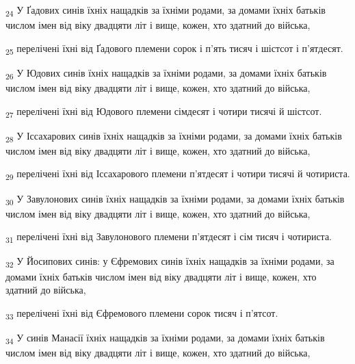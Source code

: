 \begin{tcolorbox}
\textsubscript{24} У Ґадових синів їхніх нащадків за їхніми родами, за домами їхніх батьків числом імен від віку двадцяти літ і вище, кожен, хто здатний до війська,
\end{tcolorbox}
\begin{tcolorbox}
\textsubscript{25} перелічені їхні від Ґадового племени сорок і п'ять тисяч і шістсот і п'ятдесят.
\end{tcolorbox}
\begin{tcolorbox}
\textsubscript{26} У Юдових синів їхніх нащадків за їхніми родами, за домами їхніх батьків числом імен від віку двадцяти літ і вище, кожен, хто здатний до війська,
\end{tcolorbox}
\begin{tcolorbox}
\textsubscript{27} перелічені їхні від Юдового племени сімдесят і чотири тисячі й шістсот.
\end{tcolorbox}
\begin{tcolorbox}
\textsubscript{28} У Іссахарових синів їхніх нащадків за їхніми родами, за домами їхніх батьків числом імен від віку двадцяти літ і вище, кожен, хто здатний до війська,
\end{tcolorbox}
\begin{tcolorbox}
\textsubscript{29} перелічені їхні від Іссахарового племени п'ятдесят і чотири тисячі й чотириста.
\end{tcolorbox}
\begin{tcolorbox}
\textsubscript{30} У Завулонових синів їхніх нащадків за їхніми родами, за домами їхніх батьків числом імен від віку двадцяти літ і вище, кожен, хто здатний до війська,
\end{tcolorbox}
\begin{tcolorbox}
\textsubscript{31} перелічені їхні від Завулонового племени п'ятдесят і сім тисяч і чотириста.
\end{tcolorbox}
\begin{tcolorbox}
\textsubscript{32} У Йосипових синів: у Єфремових синів їхніх нащадків за їхніми родами, за домами їхніх батьків числом імен від віку двадцяти літ і вище, кожен, хто здатний до війська,
\end{tcolorbox}
\begin{tcolorbox}
\textsubscript{33} перелічені їхні від Єфремового племени сорок тисяч і п'ятсот.
\end{tcolorbox}
\begin{tcolorbox}
\textsubscript{34} У синів Манасії їхніх нащадків за їхніми родами, за домами їхніх батьків числом імен від віку двадцяти літ і вище, кожен, хто здатний до війська,
\end{tcolorbox}
